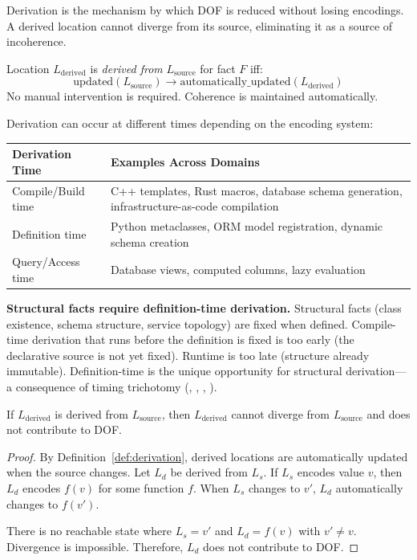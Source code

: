 Derivation is the mechanism by which DOF is reduced without losing encodings. A derived location cannot diverge from its source, eliminating it as a source of incoherence.

\begin{definition}[Derivation]\label{def:derivation}
Location $L_{\text{derived}}$ is \emph{derived from} $L_{\text{source}}$ for fact $F$ iff:
\[
\text{updated}(L_{\text{source}}) \rightarrow \text{automatically\_updated}(L_{\text{derived}})
\]
No manual intervention is required. Coherence is maintained automatically.
\end{definition}

Derivation can occur at different times depending on the encoding system:

\begin{center}
\begin{tabularx}{\linewidth}{lY}
\toprule
\textbf{Derivation Time} & \textbf{Examples Across Domains} \\
\midrule
Compile/Build time & C++ templates, Rust macros, database schema generation, infrastructure-as-code compilation \\
Definition time & Python metaclasses, ORM model registration, dynamic schema creation \\
Query/Access time & Database views, computed columns, lazy evaluation \\
\bottomrule
\end{tabularx}
\end{center}

\textbf{Structural facts require definition-time derivation.} Structural facts (class existence, schema structure, service topology) are fixed when defined. Compile-time derivation that runs before the definition is fixed is too early (the declarative source is not yet fixed). Runtime is too late (structure already immutable). Definition-time is the unique opportunity for structural derivation---a consequence of timing trichotomy (, , , ).

\begin{theorem}\label{thm:derivation-excludes}
If $L_{\text{derived}}$ is derived from $L_{\text{source}}$, then $L_{\text{derived}}$ cannot diverge from $L_{\text{source}}$ and does not contribute to DOF.
\end{theorem}

\begin{proof}
By Definition~\ref{def:derivation}, derived locations are automatically updated when the source changes. Let $L_d$ be derived from $L_s$. If $L_s$ encodes value $v$, then $L_d$ encodes $f(v)$ for some function $f$. When $L_s$ changes to $v'$, $L_d$ automatically changes to $f(v')$.

There is no reachable state where $L_s = v'$ and $L_d = f(v)$ with $v' \neq v$. Divergence is impossible. Therefore, $L_d$ does not contribute to DOF.
\end{proof}

